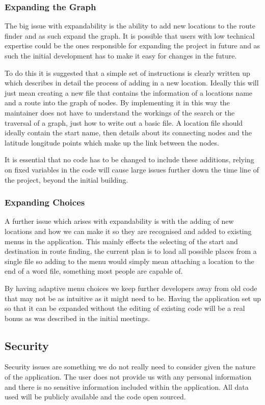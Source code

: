 \subsubsection{Expanding the Graph}

The big issue with expandability is the ability to add new locations to the route finder and as such expand the graph. It is possible that users with low technical expertise could be the ones responsible for expanding the project in future and as such the initial development has to make it easy for changes in the future.

To do this it is suggested that a simple set of instructions is clearly written up which describes in detail the process of adding in a new location. Ideally this will just mean creating a new file that contains the information of a locations name and a route into the graph of nodes. By implementing it in this way the maintainer does not have to understand the workings of the search or the traversal of a graph, just how to write out a basic file. A location file should ideally contain the start name, then details about its connecting nodes and the latitude longitude points which make up the link between the nodes.

It is essential that no code has to be changed to include these additions, relying on fixed variables in the code will cause large issues further down the time line of the project, beyond the initial building. 
\subsubsection{Expanding Choices}
A further issue which arises with expandability is with the adding of new locations and how we can make it so they are recognised and added to existing menus in the application. This mainly effects the selecting of the start and destination in route finding, the current plan is to load all possible places from a single file so adding to the menu would simply mean attaching a location to the end of a word file, something most people are capable of. 

By having adaptive menu choices we keep further developers away from old code that may not be as intuitive as it might need to be. Having the application set up so that it can be expanded without the editing of existing code will be a real bonus as was described in the initial meetings. 

\subsection{Security}
Security issues are something we do not really need to consider given the nature of the application. The user does not provide us with any personal information and there is no sensitive information included within the application. All data used will be publicly available and the code open sourced. 

